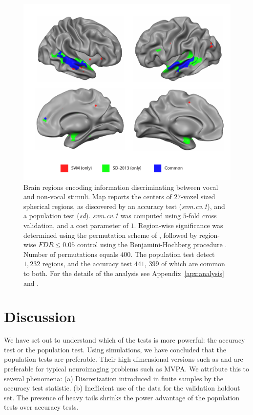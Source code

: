 \documentclass[12pt,a4paper]{article}
\theoremstyle{definition}
\begin{document}
\begin{figure}[th]
\centering
\includegraphics[width=0.7\linewidth]{"art/svm_vs_SD"}
\caption{\footnotesize
Brain regions encoding information discriminating between vocal and non-vocal stimuli.
Map reports the centers of $27$-voxel sized spherical regions, as discovered by an accuracy test (\emph{svm.cv.1}), and a population test (\emph{sd}). 
\emph{svm.cv.1} was computed using $5$-fold cross validation, and a cost parameter of $1$. 
Region-wise significance was determined using the permutation scheme of \cite{stelzer_statistical_2013}, followed by region-wise $FDR \leq 0.05$ control using the Benjamini-Hochberg procedure \citep{benjamini_controlling_1995}.
Number of permutations equals $400$.
The population test detect $1,232$ regions, and the accuracy test $441$, $399$ of which are common to both.
For the details of the analysis see Appendix~\ref{apx:analysis} and \cite{gilron_quantifying_2016}.  
  }
\label{fig:read_data}
\end{figure}








\section{Discussion}
\label{sec:discussion}

We have set out to understand which of the tests is more powerful: the accuracy test or the population test. 
Using simulations, we have concluded that the population tests are preferable. 
Their high dimensional versions such as \cite{srivastava_multivariate_2007} and \cite{schafer_shrinkage_2005} are preferable for typical neuroimaging problems such as MVPA.
We attribute this to several phenomena: 
(a) Discretization introduced in finite samples by the accuracy test statistic. 
(b) Inefficient use of the data for the validation holdout set. 
The presence of heavy tails shrinks the power advantage of the population tests over accuracy tests. 
\end{document}
